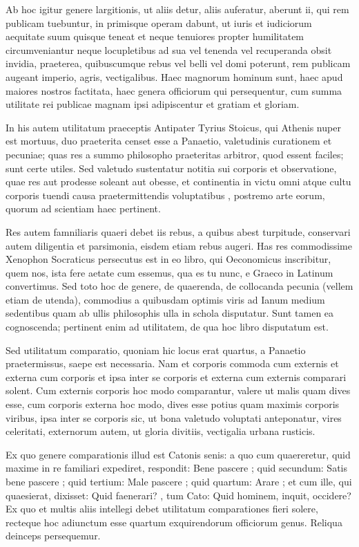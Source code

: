  Ab hoc igitur genere largitionis, ut aliis detur, aliis auferatur, aberunt ii, qui rem publicam tuebuntur, in primisque operam dabunt, ut iuris et iudiciorum aequitate suum quisque teneat et neque tenuiores propter humilitatem circumveniantur neque locupletibus ad sua vel tenenda vel recuperanda obsit invidia, praeterea, quibuscumque rebus vel belli vel domi poterunt, rem publicam augeant imperio, agris, vectigalibus. Haec magnorum hominum sunt, haec apud maiores nostros factitata, haec genera officiorum qui persequentur, cum summa utilitate rei publicae magnam ipsi adipiscentur et gratiam et gloriam.

 In his autem utilitatum praeceptis Antipater Tyrius Stoicus, qui Athenis nuper est mortuus, duo praeterita censet esse a Panaetio, valetudinis curationem et pecuniae; quas res a summo philosopho praeteritas arbitror, quod essent faciles; sunt certe utiles. Sed valetudo sustentatur notitia sui corporis et observatione, quae res aut prodesse soleant aut obesse, et continentia in victu omni atque cultu corporis tuendi causa praetermittendis voluptatibus , postremo arte eorum, quorum ad scientiam haec pertinent.

 Res autem famniliaris quaeri debet iis rebus, a quibus abest turpitude, conservari autem diligentia et parsimonia, eisdem etiam rebus augeri. Has res commodissime Xenophon Socraticus persecutus est in eo libro, qui Oeconomicus inscribitur, quem nos, ista fere aetate cum essemus, qua es tu nunc, e Graeco in Latinum convertimus. Sed toto hoc de genere, de quaerenda, de collocanda pecunia (vellem etiam de utenda), commodius a quibusdam optimis viris ad Ianum medium sedentibus quam ab ullis philosophis ulla in schola disputatur. Sunt tamen ea cognoscenda; pertinent enim ad utilitatem, de qua hoc libro disputatum est.

 Sed utilitatum comparatio, quoniam hic locus erat quartus, a Panaetio praetermissus, saepe est necessaria. Nam et corporis commoda cum externis et externa cum corporis et ipsa inter se corporis et externa cum externis comparari solent. Cum externis corporis hoc modo comparantur, valere ut malis quam dives esse, cum corporis externa hoc modo, dives esse potius quam maximis corporis viribus, ipsa inter se corporis sic, ut bona valetudo voluptati anteponatur, vires celeritati, externorum autem, ut gloria divitiis, vectigalia urbana rusticis.

 Ex quo genere comparationis illud est Catonis senis: a quo cum quaereretur, quid maxime in re familiari expediret, respondit: Bene pascere ; quid secundum: Satis bene pascere ; quid tertium: Male pascere ; quid quartum: Arare ; et cum ille, qui quaesierat, dixisset: Quid faenerari? , tum Cato: Quid hominem, inquit, occidere? Ex quo et multis aliis intellegi debet utilitatum comparationes fieri solere, recteque hoc adiunctum esse quartum exquirendorum officiorum genus. Reliqua deinceps persequemur.


